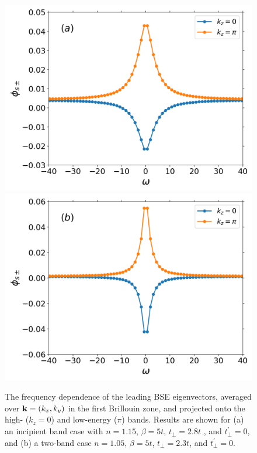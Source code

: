 \documentclass[prb,twocolumn,amsmath,amssymb,superscriptaddress,floatfix,nofootinbib]{revtex4-2}
\begin{document}
\begin{figure}[t]
\centering
\includegraphics[scale=0.4]{kaveraged_eig_U6_tp2pt8_tpp0_bt5_n0pt85.png}
\includegraphics[scale=0.4]{kaveraged_Eig_U6_tp2pt3_tpp0_bt5_n0pt95.png}
\caption{The frequency dependence of the leading BSE eigenvectors, averaged over ${\bf k} = (k_x,k_y)$ in the first Brillouin zone, and projected onto the high- ($k_z = 0$) and low-energy ($\pi$) bands. Results are shown for (a) an incipient band case with $n=1.15$, $\beta=5t$, $t_{\perp}=2.8t$ , and $t_\perp^\prime = 0$, and (b) a two-band case $n=1.05$, $\beta=5t$, $t_{\perp}=2.3t$, and $t_\perp^\prime = 0$.}
\label{fig:kavEig}
\end{figure}
\end{document}

